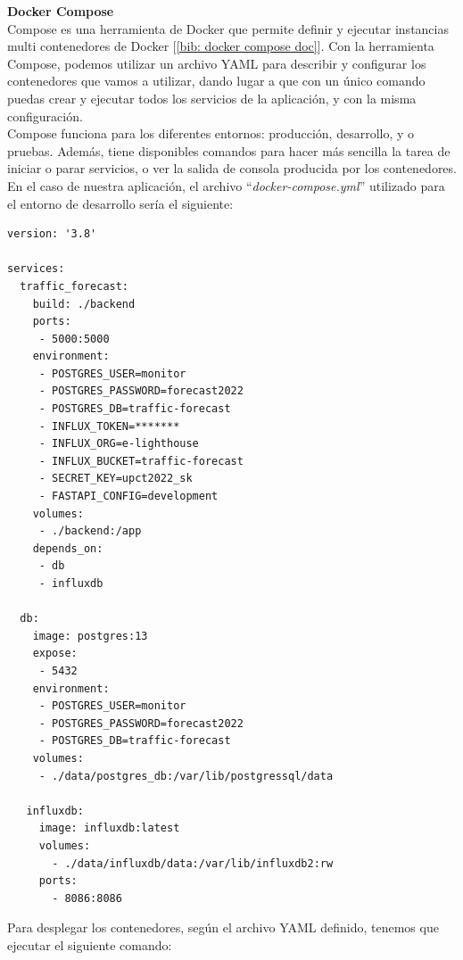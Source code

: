 \documentclass[a4paper, oneside, 12pt]{book}
\begin{document}
	\pagebreak
	
	\noindent \textbf{\large Docker Compose} \\
	
	\noindent Compose es una herramienta de Docker que permite definir y ejecutar instancias multi contenedores de Docker [\ref{bib: docker compose doc}]. Con la herramienta Compose, podemos utilizar un archivo YAML para describir y configurar los contenedores que vamos a utilizar, dando lugar a que con un único comando puedas crear y ejecutar todos los servicios de la aplicación, y con la misma configuración. \\
	
	\noindent Compose funciona para los diferentes entornos: producción, desarrollo, y o pruebas. Además, tiene disponibles comandos para hacer más sencilla la tarea de iniciar o parar servicios, o ver la salida de consola producida por los contenedores. \\
	
	\noindent En el caso de nuestra aplicación, el archivo ``\textit{docker-compose.yml}'' utilizado para el entorno de desarrollo sería el siguiente:
	
	\begin{lstlisting}[style=yaml, caption={Archivo configuración de contenedores para entorno de desarrollo.}]
version: '3.8'

services:
  traffic_forecast:
    build: ./backend
    ports:
     - 5000:5000
    environment:
     - POSTGRES_USER=monitor
     - POSTGRES_PASSWORD=forecast2022
     - POSTGRES_DB=traffic-forecast
     - INFLUX_TOKEN=*******
     - INFLUX_ORG=e-lighthouse
     - INFLUX_BUCKET=traffic-forecast
     - SECRET_KEY=upct2022_sk
     - FASTAPI_CONFIG=development
    volumes:
     - ./backend:/app
    depends_on:
     - db
     - influxdb

  db:
    image: postgres:13
    expose:
     - 5432
    environment:
     - POSTGRES_USER=monitor
     - POSTGRES_PASSWORD=forecast2022
     - POSTGRES_DB=traffic-forecast
    volumes:
     - ./data/postgres_db:/var/lib/postgressql/data
    
   influxdb:
     image: influxdb:latest
     volumes:
       - ./data/influxdb/data:/var/lib/influxdb2:rw
     ports:
       - 8086:8086
	\end{lstlisting}

	\pagebreak
	
	\noindent Para desplegar los contenedores, según el archivo YAML definido, tenemos que ejecutar el siguiente comando: 
	
\end{document}
